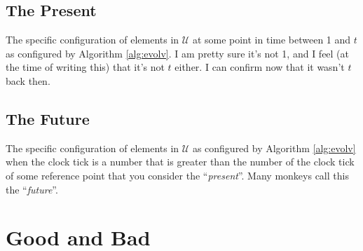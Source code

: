 \documentclass{report}
\begin{document}
\section{The Present}
The specific configuration of elements in $\mathcal{U}$ at some point in time between 1
and $t$ as configured by Algorithm \ref{alg:evolv}. I am pretty sure it's not 1,
and I feel (at the time of writing this) that it's not $t$ either. I can
confirm now that it wasn't $t$ back then.

\section{The Future}
The specific configuration of elements in $\mathcal{U}$ as configured by Algorithm
\ref{alg:evolv} when the clock tick is a number that is greater than the number
of the clock tick of some reference point that you consider the
``\emph{present}''. Many monkeys call this the ``\emph{future}''.

\chapter{Good and Bad}
\end{document}
